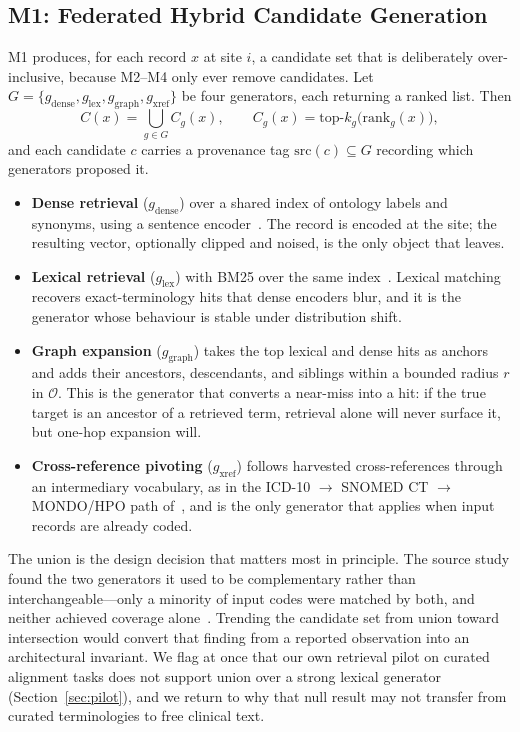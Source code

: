 \documentclass[conference]{IEEEtran}
\newcommand{\onto}{\mathcal{O}}
\begin{document}
\subsection{M1: Federated Hybrid Candidate Generation}

M1 produces, for each record $x$ at site $i$, a candidate set that is deliberately over-inclusive, because M2--M4 only ever remove candidates. Let $G = \{g_{\mathrm{dense}}, g_{\mathrm{lex}}, g_{\mathrm{graph}}, g_{\mathrm{xref}}\}$ be four generators, each returning a ranked list. Then
\begin{equation}
C(x) = \bigcup_{g \in G} C_g(x), \qquad
C_g(x) = \mathrm{top}\text{-}k_g\big(\mathrm{rank}_g(x)\big),
\end{equation}
and each candidate $c$ carries a provenance tag $\mathrm{src}(c) \subseteq G$ recording which generators proposed it.

\begin{itemize}
\item \textbf{Dense retrieval} ($g_{\mathrm{dense}}$) over a shared index of ontology labels and synonyms, using a sentence encoder~\cite{b18}. The record is encoded at the site; the resulting vector, optionally clipped and noised, is the only object that leaves.
\item \textbf{Lexical retrieval} ($g_{\mathrm{lex}}$) with BM25 over the same index~\cite{b17}. Lexical matching recovers exact-terminology hits that dense encoders blur, and it is the generator whose behaviour is stable under distribution shift.
\item \textbf{Graph expansion} ($g_{\mathrm{graph}}$) takes the top lexical and dense hits as anchors and adds their ancestors, descendants, and siblings within a bounded radius $r$ in $\onto$. This is the generator that converts a near-miss into a hit: if the true target is an ancestor of a retrieved term, retrieval alone will never surface it, but one-hop expansion will.
\item \textbf{Cross-reference pivoting} ($g_{\mathrm{xref}}$) follows harvested cross-references through an intermediary vocabulary, as in the ICD-10 $\rightarrow$ SNOMED CT $\rightarrow$ MONDO/HPO path of~\cite{b1}, and is the only generator that applies when input records are already coded.
\end{itemize}

The union is the design decision that matters most in principle. The source study found the two generators it used to be complementary rather than interchangeable---only a minority of input codes were matched by both, and neither achieved coverage alone~\cite{b1}. Trending the candidate set from union toward intersection would convert that finding from a reported observation into an architectural invariant. We flag at once that our own retrieval pilot on curated alignment tasks does not support union over a strong lexical generator (Section~\ref{sec:pilot}), and we return to why that null result may not transfer from curated terminologies to free clinical text.
\end{document}
